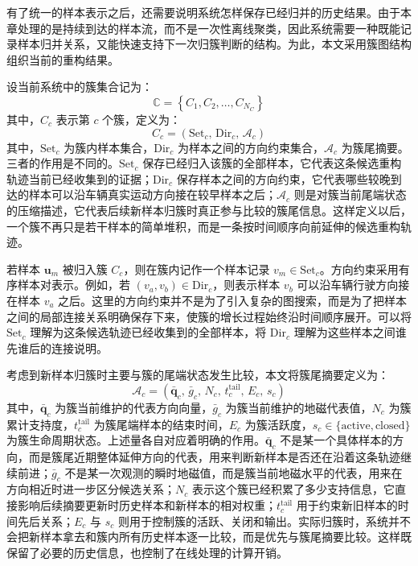 \documentclass{xdupgthesis}
\begin{document}
有了统一的样本表示之后，还需要说明系统怎样保存已经归并的历史结果。由于本章处理的是持续到达的样本流，而不是一次性离线聚类，因此系统需要一种既能记录样本归并关系，又能快速支持下一次归簇判断的结构。为此，本文采用簇图结构组织当前的重构结果。

设当前系统中的簇集合记为：
\begin{equation}
	\mathbb{C}=\left\{C_1,C_2,\ldots,C_{N_C}\right\}
\end{equation}
其中，$C_c$ 表示第 $c$ 个簇，定义为：
\begin{equation}
	C_c=
	\left(
	\mathrm{Set}_c,\,
	\mathrm{Dir}_c,\,
	\mathcal{A}_c
	\right)
\end{equation}
其中，$\mathrm{Set}_c$ 为簇内样本集合，$\mathrm{Dir}_c$ 为样本之间的方向约束集合，$\mathcal{A}_c$ 为簇尾摘要。三者的作用是不同的。$\mathrm{Set}_c$ 保存已经归入该簇的全部样本，它代表这条候选重构轨迹当前已经收集到的证据；$\mathrm{Dir}_c$ 保存样本之间的方向约束，它代表哪些较晚到达的样本可以沿车辆真实运动方向接在较早样本之后；$\mathcal{A}_c$ 则是对簇当前尾端状态的压缩描述，它代表后续新样本归簇时真正参与比较的簇尾信息。这样定义以后，一个簇不再只是若干样本的简单堆积，而是一条按时间顺序向前延伸的候选重构轨迹。

若样本 $\mathbf{u}_m$ 被归入簇 $C_c$，则在簇内记作一个样本记录 $v_m\in\mathrm{Set}_c$。方向约束采用有序样本对表示。例如，若 $(v_a,v_b)\in\mathrm{Dir}_c$，则表示样本 $v_b$ 可以沿车辆行驶方向接在样本 $v_a$ 之后。这里的方向约束并不是为了引入复杂的图搜索，而是为了把样本之间的局部连接关系明确保存下来，使簇的增长过程始终沿时间顺序展开。可以将 $\mathrm{Set}_c$ 理解为这条候选轨迹已经收集到的全部样本，将 $\mathrm{Dir}_c$ 理解为这些样本之间谁先谁后的连接说明。

考虑到新样本归簇时主要与簇的尾端状态发生比较，本文将簇尾摘要定义为：
\begin{equation}
	\mathcal{A}_c=
	\left(
	\bar{\mathbf{q}}_c,\,
	\bar{g}_c,\,
	N_c,\,
	t_c^{\mathrm{tail}},\,
	E_c,\,
	s_c
	\right)
\end{equation}
其中，$\bar{\mathbf{q}}_c$ 为簇当前维护的代表方向向量，$\bar{g}_c$ 为簇当前维护的地磁代表值，$N_c$ 为簇累计支持度，$t_c^{\mathrm{tail}}$ 为簇尾端样本的结束时间，$E_c$ 为簇活跃度，$s_c\in\{\mathrm{active},\mathrm{closed}\}$ 为簇生命周期状态。上述量各自对应着明确的作用。$\bar{\mathbf{q}}_c$ 不是某一个具体样本的方向，而是簇尾近期整体延伸方向的代表，用来判断新样本是否还在沿着这条轨迹继续前进；$\bar{g}_c$ 不是某一次观测的瞬时地磁值，而是簇当前地磁水平的代表，用来在方向相近时进一步区分候选关系；$N_c$ 表示这个簇已经积累了多少支持信息，它直接影响后续摘要更新时历史样本和新样本的相对权重；$t_c^{\mathrm{tail}}$ 用于约束新旧样本的时间先后关系；$E_c$ 与 $s_c$ 则用于控制簇的活跃、关闭和输出。实际归簇时，系统并不会把新样本拿去和簇内所有历史样本逐一比较，而是优先与簇尾摘要比较。这样既保留了必要的历史信息，也控制了在线处理的计算开销。
\end{document}

